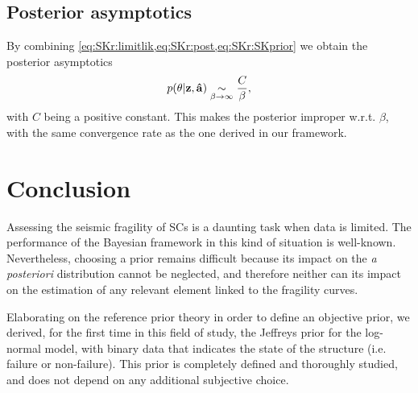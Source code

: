     \subsection{Posterior asymptotics}
\label{subapp:C3}
    By combining \cref{eq:SKr:limitlik,eq:SKr:post,eq:SKr:SKprior} we obtain the posterior asymptotics
    \begin{equation}
            p(\theta|\mathbf{z}, \mathbf{\hat a}) \underset{\beta\rightarrow{\infty}}{\sim} \frac{C}{\beta},
        \end{equation}
 with $C$ being a positive constant.
    This makes the posterior improper w.r.t. $\beta$, with the same convergence rate as the one derived in our framework.
        
    


\section{Conclusion}





Assessing the seismic fragility of SCs is a daunting task when data is limited. The performance of the Bayesian framework in this kind of situation is well-known. Nevertheless, choosing a prior remains difficult because its impact on the \emph{a posteriori} distribution cannot be neglected, and therefore neither can its impact on the estimation of any relevant element linked to the fragility curves. 

Elaborating on the reference prior theory in order to define an objective prior, we derived, for the first time in this field of study, the Jeffreys prior for the log-normal model, with binary data that indicates the state of the structure (i.e. failure or non-failure). This prior is completely defined and thoroughly studied, and does not depend on any additional subjective choice.

